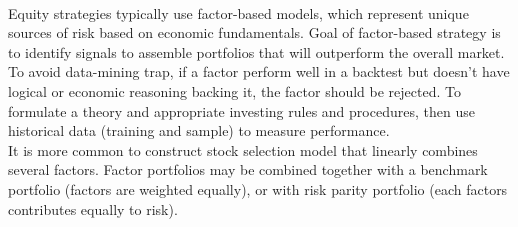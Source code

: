 \begin{remark} \\
Equity strategies typically use factor-based models, which represent unique sources of risk based on economic fundamentals. Goal of factor-based strategy is to identify signals to assemble portfolios that will outperform the overall market. To avoid data-mining trap, if a factor perform well in a backtest but doesn't have logical or economic reasoning backing it, the factor should be rejected. To formulate a theory and appropriate investing rules and procedures, then use historical data (training and sample) to measure performance.\\
It is more common to construct stock selection model that linearly combines several factors. Factor portfolios may be combined together with a benchmark portfolio (factors are weighted equally), or with risk parity portfolio (each factors contributes equally to risk).
\end{remark}

